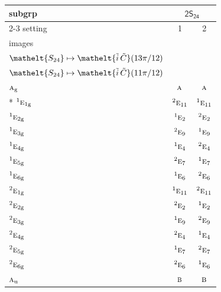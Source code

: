 \documentclass[10pt,a4paper]{article}
\numberwithin{equation}{section}
\newcommand{\eltfont}[1]{{\let\sigma\eltsigma\mathelt{#1}}}
\newcommand{\grp}[1]{\mathsf{#1}}
\newcommand{\irr}[1]{\text{\normalfont\scshape #1}}
\newcommand{\conjpair}[1]{{}^{#1}}
\newcommand{\cls}[1]{\eltfont{#1}}
\newcommand{\elt}[1]{\eltfont{#1}}
\newcommand{\ptag}[1]{\mathrm{#1}}
\newcommand{\lift}[1]{\tilde{#1}}
\begin{document}
{\small\begin{longtable}{@{}lcc@{}}\toprule
subgrp & \multicolumn{2}{c}{\href{2S24.pdf}{$\grp{2S_{24}}$}}\\\cmidrule(lr){2-3}
setting & 1 & 2\\
images & {\scriptsize\begin{tabular}[t]{@{}c@{}}$\cls{C_{12}} \mapsto \elt{\lift{C}}(\pi/6)$\\$\cls{S_{24}} \mapsto \elt{\lift{i}\,\lift{C}}(13\pi/12)$\end{tabular}} & {\scriptsize\begin{tabular}[t]{@{}c@{}}$\cls{C_{12}} \mapsto \elt{\lift{C}}(11\pi/6)$\\$\cls{S_{24}} \mapsto \elt{\lift{i}\,\lift{C}}(11\pi/12)$\end{tabular}}\\\midrule\endhead
\bottomrule\endfoot\endlastfoot
$\irr{a}_{\ptag{g}}$ & $\irr{a}$ & $\irr{a}$\\*
$\conjpair{1}\irr{e}_{1\ptag{g}}$ & $\conjpair{2}\irr{e}_{11}$ & $\conjpair{1}\irr{e}_{11}$\\
$\conjpair{1}\irr{e}_{2\ptag{g}}$ & $\conjpair{1}\irr{e}_{2}$ & $\conjpair{2}\irr{e}_{2}$\\
$\conjpair{1}\irr{e}_{3\ptag{g}}$ & $\conjpair{2}\irr{e}_{9}$ & $\conjpair{1}\irr{e}_{9}$\\
$\conjpair{1}\irr{e}_{4\ptag{g}}$ & $\conjpair{1}\irr{e}_{4}$ & $\conjpair{2}\irr{e}_{4}$\\
$\conjpair{1}\irr{e}_{5\ptag{g}}$ & $\conjpair{2}\irr{e}_{7}$ & $\conjpair{1}\irr{e}_{7}$\\
$\conjpair{1}\irr{e}_{6\ptag{g}}$ & $\conjpair{1}\irr{e}_{6}$ & $\conjpair{2}\irr{e}_{6}$\\
$\conjpair{2}\irr{e}_{1\ptag{g}}$ & $\conjpair{1}\irr{e}_{11}$ & $\conjpair{2}\irr{e}_{11}$\\
$\conjpair{2}\irr{e}_{2\ptag{g}}$ & $\conjpair{2}\irr{e}_{2}$ & $\conjpair{1}\irr{e}_{2}$\\
$\conjpair{2}\irr{e}_{3\ptag{g}}$ & $\conjpair{1}\irr{e}_{9}$ & $\conjpair{2}\irr{e}_{9}$\\
$\conjpair{2}\irr{e}_{4\ptag{g}}$ & $\conjpair{2}\irr{e}_{4}$ & $\conjpair{1}\irr{e}_{4}$\\
$\conjpair{2}\irr{e}_{5\ptag{g}}$ & $\conjpair{1}\irr{e}_{7}$ & $\conjpair{2}\irr{e}_{7}$\\
$\conjpair{2}\irr{e}_{6\ptag{g}}$ & $\conjpair{2}\irr{e}_{6}$ & $\conjpair{1}\irr{e}_{6}$\\
$\irr{a}_{\ptag{u}}$ & $\irr{b}$ & $\irr{b}$\\

\end{longtable}}
\end{document}
